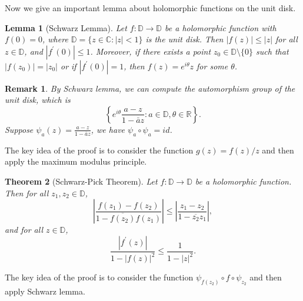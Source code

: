\documentclass{article}
\newtheorem{theorem}{Theorem}[section]
\newtheorem{lemma}[theorem]{Lemma}
\newtheorem*{remark}{Remark}
\theoremstyle{definition}
\newcommand{\R}{\mathbb{R}}
\newcommand{\C}{\mathbb{C}}
\renewcommand{\leq}{\leqslant}
\begin{document}
Now we give an important lemma about holomorphic functions on the unit disk.
\begin{lemma}[Schwarz Lemma]
Let \(f\colon\mathbb{D}\to\mathbb{D}\) be a holomorphic function with \(f(0)=0\), where \(\mathbb{D}=\{z\in\C\colon|z|<1\}\) is the unit disk. Then \(|f(z)|\leq |z|\) for all \(z\in\mathbb{D}\), and \(|f^{\prime}(0)|\leq 1\). Moreover, if there exists a point \(z_0\in\mathbb{D}\setminus\{0\}\) such that \(|f(z_0)|=|z_0|\) or if \(|f^{\prime}(0)|=1\), then \(f(z)=e^{i\theta} z\) for some \(\theta\).
\end{lemma}
\begin{remark}
    By Schwarz lemma, we can compute the automorphism group of the unit disk, which is 
    \[\left\{e^{i\theta}\frac{a-z}{1-\bar{a}z}\colon a\in\mathbb{D}, \theta\in\R\right\}.\]
    Suppose $\psi_a(z) = \frac{a-z}{1-\bar{a}z}$, we have $\psi_a\circ \psi_a=id$.
\end{remark}
The key idea of the proof is to consider the function $g(z)=f(z)/{z}$ and then apply the maximum modulus principle.
\begin{theorem}[Schwarz-Pick Theorem]
Let \(f\colon\mathbb{D}\to\mathbb{D}\) be a holomorphic function. Then for all \(z_1,z_2\in\mathbb{D}\),
\begin{equation*}
    \left|\frac{f(z_1)-f(z_2)}{1-\overline{f(z_2)}f(z_1)}\right| \leq \left|\frac{z_1-z_2}{1-\overline{z_2}z_1}\right|,
\end{equation*}
and for all \(z\in\mathbb{D}\),
\begin{equation*}
    \frac{|f^{\prime}(z)|}{1-|f(z)|^2} \leq \frac{1}{1-|z|^2}.
\end{equation*}
\end{theorem}
The key idea of the proof is to consider the function $\psi_{f(z_2)}\circ f\circ \psi_{z_2}$ and then apply Schwarz lemma.
\end{document}
